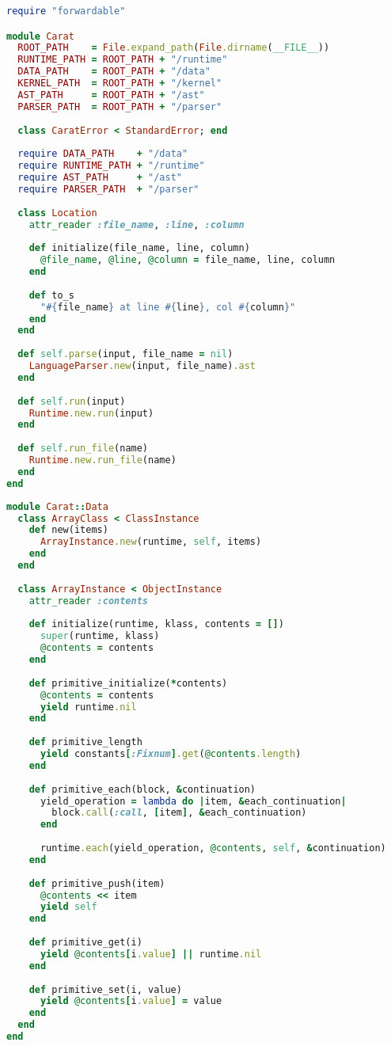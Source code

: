 \begin{lstlisting}[title={\small\ttfamily\bfseries carat.rb},language=Ruby]
require "forwardable"

module Carat
  ROOT_PATH    = File.expand_path(File.dirname(__FILE__))
  RUNTIME_PATH = ROOT_PATH + "/runtime"
  DATA_PATH    = ROOT_PATH + "/data"
  KERNEL_PATH  = ROOT_PATH + "/kernel"
  AST_PATH     = ROOT_PATH + "/ast"
  PARSER_PATH  = ROOT_PATH + "/parser"
  
  class CaratError < StandardError; end
  
  require DATA_PATH    + "/data"
  require RUNTIME_PATH + "/runtime"
  require AST_PATH     + "/ast"
  require PARSER_PATH  + "/parser"
  
  class Location
    attr_reader :file_name, :line, :column
    
    def initialize(file_name, line, column)
      @file_name, @line, @column = file_name, line, column
    end
    
    def to_s
      "#{file_name} at line #{line}, col #{column}"
    end
  end
  
  def self.parse(input, file_name = nil)
    LanguageParser.new(input, file_name).ast
  end
  
  def self.run(input)
    Runtime.new.run(input)
  end
  
  def self.run_file(name)
    Runtime.new.run_file(name)
  end
end

\end{lstlisting}
\begin{lstlisting}[title={\small\ttfamily\bfseries data/array.rb},language=Ruby]
module Carat::Data
  class ArrayClass < ClassInstance
    def new(items)
      ArrayInstance.new(runtime, self, items)
    end
  end
  
  class ArrayInstance < ObjectInstance
    attr_reader :contents
    
    def initialize(runtime, klass, contents = [])
      super(runtime, klass)
      @contents = contents
    end
    
    def primitive_initialize(*contents)
      @contents = contents
      yield runtime.nil
    end
    
    def primitive_length
      yield constants[:Fixnum].get(@contents.length)
    end
    
    def primitive_each(block, &continuation)
      yield_operation = lambda do |item, &each_continuation|
        block.call(:call, [item], &each_continuation)
      end
      
      runtime.each(yield_operation, @contents, self, &continuation)
    end
    
    def primitive_push(item)
      @contents << item
      yield self
    end
    
    def primitive_get(i)
      yield @contents[i.value] || runtime.nil
    end
    
    def primitive_set(i, value)
      yield @contents[i.value] = value
    end
  end
end

\end{lstlisting}
